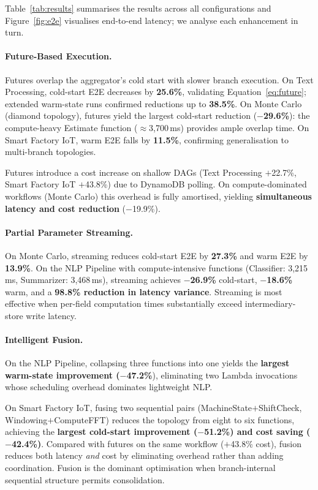 \documentclass[runningheads]{llncs}
\begin{document}
Table~\ref{tab:results} summarises the results across all configurations and Figure~\ref{fig:e2e} visualises end-to-end latency; we analyse each enhancement in turn.

\paragraph{Future-Based Execution.}
Futures overlap the aggregator's cold start with slower branch execution. On Text Processing, cold-start E2E decreases by \textbf{25.6\%}, validating Equation~\eqref{eq:future}; extended warm-state runs confirmed reductions up to \textbf{38.5\%}. On Monte Carlo (diamond topology), futures yield the largest cold-start reduction (\textbf{$-$29.6\%}): the compute-heavy Estimate function ($\approx$3,700\,ms) provides ample overlap time. On Smart Factory IoT, warm E2E falls by \textbf{11.5\%}, confirming generalisation to multi-branch topologies.

Futures introduce a cost increase on shallow DAGs (Text Processing $+$22.7\%, Smart Factory IoT $+$43.8\%) due to DynamoDB polling. On compute-dominated workflows (Monte Carlo) this overhead is fully amortised, yielding \textbf{simultaneous latency and cost reduction} ($-$19.9\%).

\paragraph{Partial Parameter Streaming.}
On Monte Carlo, streaming reduces cold-start E2E by \textbf{27.3\%} and warm E2E by \textbf{13.9\%}. On the NLP Pipeline with compute-intensive functions (Classifier: 3,215\,ms, Summarizer: 3,468\,ms), streaming achieves \textbf{$-$26.9\%} cold-start, \textbf{$-$18.6\%} warm, and a \textbf{98.8\% reduction in latency variance}. Streaming is most effective when per-field computation times substantially exceed intermediary-store write latency.

\paragraph{Intelligent Fusion.}
On the NLP Pipeline, collapsing three functions into one yields the \textbf{largest warm-state improvement ($-$47.2\%}), eliminating two Lambda invocations whose scheduling overhead dominates lightweight NLP.

On Smart Factory IoT, fusing two sequential pairs (MachineState$+$ShiftCheck, Windowing$+$ComputeFFT) reduces the topology from eight to six functions, achieving the \textbf{largest cold-start improvement ($-$51.2\%) and cost saving ($-$42.4\%)}. Compared with futures on the same workflow ($+$43.8\% cost), fusion reduces both latency \emph{and} cost by eliminating overhead rather than adding coordination. Fusion is the dominant optimisation when branch-internal sequential structure permits consolidation.
\end{document}
